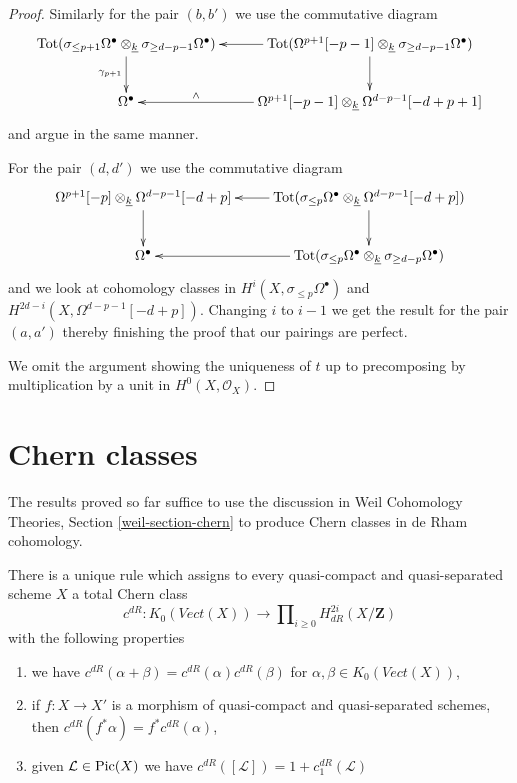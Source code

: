 \begin{proof}
\medskip\noindent
Similarly for the pair $(b, b')$ we use the commutative diagram
$$
\xymatrix{
\text{Tot}(\sigma_{\leq p + 1} \Omega^\bullet \otimes_{\underline{k}}
\sigma_{\geq d - p - 1} \Omega^\bullet) \ar[d]_{\gamma_{p + 1}} &
\text{Tot}(\Omega^{p + 1}[-p - 1] \otimes_{\underline{k}}
\sigma_{\geq d - p - 1} \Omega^\bullet) \ar[l] \ar[d] \\
\Omega^\bullet &
\Omega^{p + 1}[-p - 1]
\otimes_{\underline{k}}
\Omega^{d - p - 1}[-d + p + 1] \ar[l]_-\wedge
}
$$
and argue in the same manner.

\medskip\noindent
For the pair $(d, d')$ we use the commutative diagram
$$
\xymatrix{
\Omega^{p + 1}[-p] \otimes_{\underline{k}}
\Omega^{d - p - 1}[-d + p] \ar[d] &
\text{Tot}(\sigma_{\leq p}\Omega^\bullet \otimes_{\underline{k}}
\Omega^{d - p - 1}[-d + p]) \ar[l] \ar[d] \\
\Omega^\bullet &
\text{Tot}(\sigma_{\leq p}\Omega^\bullet \otimes_{\underline{k}}
\sigma_{\geq d - p}\Omega^\bullet) \ar[l]
}
$$
and we look at cohomology classes in
$H^i(X, \sigma_{\leq p}\Omega^\bullet)$ and
$H^{2d - i}(X, \Omega^{d - p - 1}[-d + p])$.
Changing $i$ to $i - 1$ we get the result for the pair $(a, a')$
thereby finishing the proof that our pairings are perfect.

\medskip\noindent
We omit the argument showing the uniqueness of $t$ up to
precomposing by multiplication by a unit in $H^0(X, \mathcal{O}_X)$.
\end{proof}







\section{Chern classes}
\label{section-chern-classes}

\noindent
The results proved so far suffice to use the discussion in
Weil Cohomology Theories, Section \ref{weil-section-chern}
to produce Chern classes in de Rham cohomology.

\begin{lemma}
\label{lemma-chern-classes}
There is a unique rule which assigns to every quasi-compact and
quasi-separated scheme $X$ a total Chern class
$$
c^{dR} :
K_0(\textit{Vect}(X))
\longrightarrow
\prod\nolimits_{i \geq 0} H^{2i}_{dR}(X/\mathbf{Z})
$$
with the following properties
\begin{enumerate}
\item we have $c^{dR}(\alpha + \beta) = c^{dR}(\alpha) c^{dR}(\beta)$
for $\alpha, \beta \in K_0(\textit{Vect}(X))$,
\item if $f : X \to X'$ is a morphism of quasi-compact and
quasi-separated schemes, then $c^{dR}(f^*\alpha) = f^*c^{dR}(\alpha)$,
\item given $\mathcal{L} \in \mathop{\mathrm{Pic}}\nolimits(X)$ we have
$c^{dR}([\mathcal{L}]) = 1 + c_1^{dR}(\mathcal{L})$
\end{enumerate}
\end{lemma}

